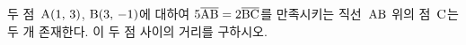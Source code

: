 두 점~$\mathrm{A}(1,\mkern3mu 3)$, $\mathrm{B}(3,\mkern3mu -1)$에 대하여 $5\overline{\mathrm{AB}}=2\overline{\mathrm{BC}}$를 만족시키는 직선~$\mathrm{AB}$ 위의 점~$\mathrm{C}$는 두 개 존재한다. 이 두 점 사이의 거리를 구하시오.
